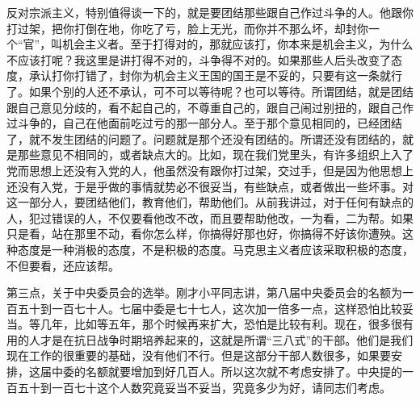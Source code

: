 反对宗派主义，特别值得谈一下的，就是要团结那些跟自己作过斗争的人。他跟你打过架，把你打倒在地，你吃了亏，脸上无光，而你并不那么坏，却封你一个“官”，叫机会主义者。至于打得对的，那就应该打，你本来是机会主义，为什么不应该打呢？我这里是讲打得不对的，斗争得不对的。如果那些人后头改变了态度，承认打你打错了，封你为机会主义王国的国王是不妥的，只要有这一条就行了。如果个别的人还不承认，可不可以等待呢？也可以等待。所谓团结，就是团结跟自己意见分歧的，看不起自己的，不尊重自己的，跟自己闹过别扭的，跟自己作过斗争的，自己在他面前吃过亏的那一部分人。至于那个意见相同的，已经团结了，就不发生团结的问题了。问题就是那个还没有团结的。所谓还没有团结的，就是那些意见不相同的，或者缺点大的。比如，现在我们党里头，有许多组织上入了党而思想上还没有入党的人，他虽然没有跟你打过架，交过手，但是因为他思想上还没有入党，于是乎做的事情就势必不很妥当，有些缺点，或者做出一些坏事。对这一部分人，要团结他们，教育他们，帮助他们。从前我讲过，对于任何有缺点的人，犯过错误的人，不仅要看他改不改，而且要帮助他改，一为看，二为帮。如果只是看，站在那里不动，看你怎么样，你搞得好那也好，你搞得不好该你遭殃。这种态度是一种消极的态度，不是积极的态度。马克思主义者应该采取积极的态度，不但要看，还应该帮。

第三点，关于中央委员会的选举。刚才小平同志讲，第八届中央委员会的名额为一百五十到一百七十人。七届中委是七十七人，这次加一倍多一点，这样恐怕比较妥当。等几年，比如等五年，那个时候再来扩大，恐怕是比较有利。现在，很多很有用的人才是在抗日战争时期培养起来的，这就是所谓“三八式”的干部。他们是我们现在工作的很重要的基础，没有他们不行。但是这部分干部人数很多，如果要安排，这届中委的名额就要增加到好几百人。所以这次就不考虑安排了。中央提的一百五十到一百七十这个人数究竟妥当不妥当，究竟多少为好，请同志们考虑。


